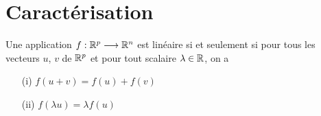 %  
%   
%   
% 
%   
% 



\section{Caractérisation}


\begin{frame}
\begin{theoreme}
\label{th:applinrn}
Une application $f: \mathbb{R}^p \longrightarrow \mathbb{R}^n$ est linéaire si et seulement si  
pour tous les vecteurs $u$, $v$ de $\mathbb{R}^p$ et pour tout scalaire $\lambda \in \mathbb{R}$,
on a
\begin{enumerate}
  \item[(i)]  $f(u+v) = f(u) + f(v)$
  \item[(ii)] $ f(\lambda u) = \lambda f(u)$
\end{enumerate} 
\end{theoreme}

\end{frame}



